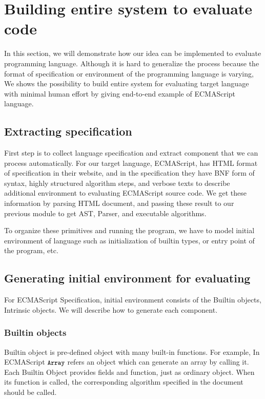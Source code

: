 \section{Building entire system to evaluate code}

In this section, we will demonstrate how our idea can be implemented to evaluate programming language. Although it is hard to generalize the process because the format of specification or 
environment of the programming language is varying, We shows the possibility to build entire system for evaluating target language with minimal human effort by giving end-to-end example of ECMAScript language.

\subsection{Extracting specification}
First step is to collect language specification and extract component that we can process automatically. For our target language, ECMAScript, has HTML format of specification in their website, and
in the specification they have BNF form of syntax, highly structured algorithm steps, and verbose texts to describe additional environment to evaluating ECMAScript source code.
We get these information by parsing HTML document, and passing these result to our previous module to get AST, Parser, and executable algorithms.

To organize these primitives and running the program, we have to model initial environment of language such as initialization of builtin types, or entry point of the program, etc.

\subsection{Generating initial environment for evaluating}
For ECMAScript Specification, initial environment consists of the Builtin objects, Intrinsic objects. We will describe how to generate each component.

\subsubsection{Builtin objects}

 Builtin object is pre-defined object with many built-in functions. For example, In ECMAScript \( \texttt{\small Array} \) refers an object which can generate an array by
 calling it. Each Builtin Object provides fields and function, just as ordinary object. When its function is called,
 the corresponding algorithm specified in the document should be called. 
 
